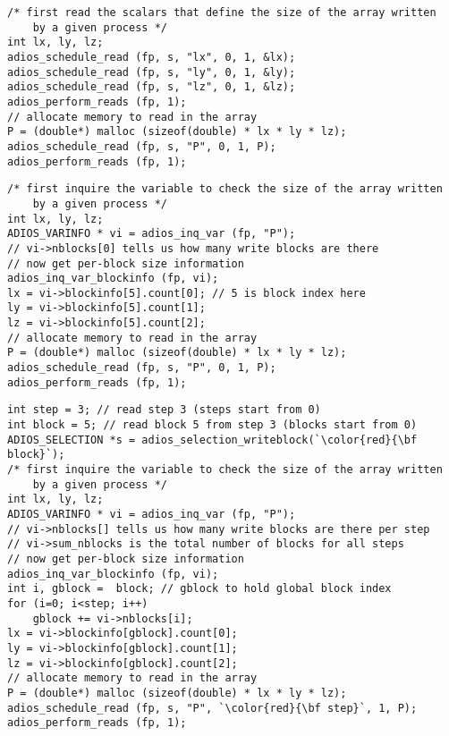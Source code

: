 \begin{lstlisting}[numbers=none, 
                   caption={Read an array written by one specific process, with first reading the scalars that define the size of the array},  
                   label=code:localread]
/* first read the scalars that define the size of the array written
    by a given process */
int lx, ly, lz;
adios_schedule_read (fp, s, "lx", 0, 1, &lx);
adios_schedule_read (fp, s, "ly", 0, 1, &ly);
adios_schedule_read (fp, s, "lz", 0, 1, &lz);
adios_perform_reads (fp, 1); 
// allocate memory to read in the array
P = (double*) malloc (sizeof(double) * lx * ly * lz);
adios_schedule_read (fp, s, "P", 0, 1, P);
adios_perform_reads (fp, 1);  
\end{lstlisting}


\begin{lstlisting}[numbers=none, 
                   frame=T,
                   caption={Read an array written by one specific process, with first checking the size},  
                   label=code:localread2]
/* first inquire the variable to check the size of the array written
    by a given process */
int lx, ly, lz;
ADIOS_VARINFO * vi = adios_inq_var (fp, "P");
// vi->nblocks[0] tells us how many write blocks are there
// now get per-block size information
adios_inq_var_blockinfo (fp, vi);
lx = vi->blockinfo[5].count[0]; // 5 is block index here
ly = vi->blockinfo[5].count[1];
lz = vi->blockinfo[5].count[2];
// allocate memory to read in the array
P = (double*) malloc (sizeof(double) * lx * ly * lz);
adios_schedule_read (fp, s, "P", 0, 1, P);
adios_perform_reads (fp, 1);  
\end{lstlisting}

\begin{lstlisting}[numbers=none, 
                   frame=T,
                   caption={Read an array written by one specific process, when multiple steps are in a file},  
                   label=code:localread3]
int step = 3; // read step 3 (steps start from 0)
int block = 5; // read block 5 from step 3 (blocks start from 0)
ADIOS_SELECTION *s = adios_selection_writeblock(`\color{red}{\bf block}`); 
/* first inquire the variable to check the size of the array written
    by a given process */
int lx, ly, lz;
ADIOS_VARINFO * vi = adios_inq_var (fp, "P");
// vi->nblocks[] tells us how many write blocks are there per step
// vi->sum_nblocks is the total number of blocks for all steps
// now get per-block size information
adios_inq_var_blockinfo (fp, vi);
int i, gblock =  block; // gblock to hold global block index
for (i=0; i<step; i++)
    gblock += vi->nblocks[i];
lx = vi->blockinfo[gblock].count[0];
ly = vi->blockinfo[gblock].count[1];
lz = vi->blockinfo[gblock].count[2];
// allocate memory to read in the array
P = (double*) malloc (sizeof(double) * lx * ly * lz);
adios_schedule_read (fp, s, "P", `\color{red}{\bf step}`, 1, P);
adios_perform_reads (fp, 1);  
\end{lstlisting}


